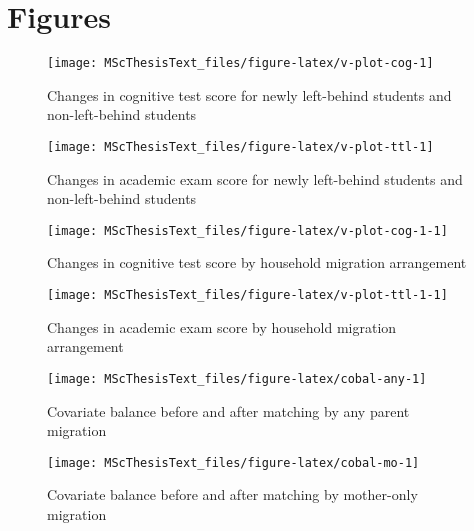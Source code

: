\documentclass[
  man,floatsintext]{apa7}
\begin{document}
\newpage

\hypertarget{figures}{%
\section{Figures}\label{figures}}



















\begin{figure}
\texttt{[image: MScThesisText\_files/figure-latex/v-plot-cog-1]} \caption{Changes in cognitive test score for newly left-behind students and non-left-behind students}\label{fig:v-plot-cog}
\end{figure}

\newpage

\begin{figure}
\texttt{[image: MScThesisText\_files/figure-latex/v-plot-ttl-1]} \caption{Changes in academic exam score for newly left-behind students and non-left-behind students}\label{fig:v-plot-ttl}
\end{figure}

\begin{figure}
\texttt{[image: MScThesisText\_files/figure-latex/v-plot-cog-1-1]} \caption{Changes in cognitive test score by household migration arrangement}\label{fig:v-plot-cog-1}
\end{figure}

\begin{figure}
\texttt{[image: MScThesisText\_files/figure-latex/v-plot-ttl-1-1]} \caption{Changes in academic exam score by household migration arrangement}\label{fig:v-plot-ttl-1}
\end{figure}

\newpage

\begin{figure}
\texttt{[image: MScThesisText\_files/figure-latex/cobal-any-1]} \caption{Covariate balance before and after matching by any parent migration}\label{fig:cobal-any}
\end{figure}

\begin{figure}
\texttt{[image: MScThesisText\_files/figure-latex/cobal-mo-1]} \caption{Covariate balance before and after matching by mother-only migration}\label{fig:cobal-mo}
\end{figure}
\end{document}
